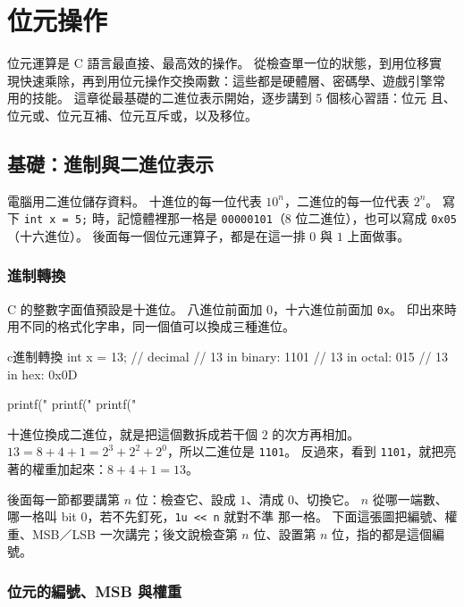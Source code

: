 \chapter{位元操作}
\label{ch:bitoperations}

位元運算是 C 語言最直接、最高效的操作。 從檢查單一位的狀態，到用位移實
現快速乘除，再到用位元操作交換兩數：這些都是硬體層、密碼學、遊戲引擎常
用的技能。 這章從最基礎的二進位表示開始，逐步講到 5 個核心習語：位元
且、位元或、位元互補、位元互斥或，以及移位。

\section{基礎：進制與二進位表示}
\label{sec:bit-basics}

電腦用二進位儲存資料。 十進位的每一位代表 $10^n$，二進位的每一位代表
$2^n$。 寫下 \texttt{int x = 5;} 時，記憶體裡那一格是
\texttt{00000101}（8 位二進位），也可以寫成 \texttt{0x05}（十六進位）。
後面每一個位元運算子，都是在這一排 $0$ 與 $1$ 上面做事。

\subsection{進制轉換}

C 的整數字面值預設是十進位。 八進位前面加 $0$，十六進位前面加
\texttt{0x}。 印出來時用不同的格式化字串，同一個值可以換成三種進位。

\begin{code}{c}{進制轉換}
int x = 13;      // decimal
// 13 in binary:  1101
// 13 in octal:   015
// 13 in hex:     0x0D

printf("%
printf("%
printf("%
\end{code}

十進位換成二進位，就是把這個數拆成若干個 $2$ 的次方再相加。 $13 = 8 +
4 + 1 = 2^3 + 2^2 + 2^0$，所以二進位是 \texttt{1101}。 反過來，看到
\texttt{1101}，就把亮著的權重加起來：$8 + 4 + 1 = 13$。

後面每一節都要講第 $n$ 位：檢查它、設成 $1$、清成 $0$、切換它。 $n$
從哪一端數、哪一格叫 bit $0$，若不先釘死，\texttt{1u << n} 就對不準
那一格。 下面這張圖把編號、權重、MSB／LSB 一次講完；後文說檢查第
$n$ 位、設置第 $n$ 位，指的都是這個編號。

\subsection{位元的編號、MSB 與權重}


